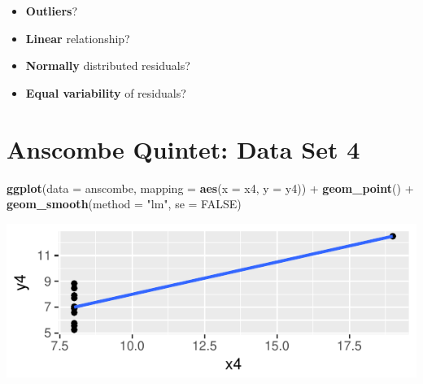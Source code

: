 \documentclass[]{article}
\newenvironment{Shaded}{\begin{snugshade}}{\end{snugshade}}
\newcommand{\KeywordTok}[1]{\textcolor[rgb]{0.13,0.29,0.53}{\textbf{{#1}}}}
\newcommand{\DataTypeTok}[1]{\textcolor[rgb]{0.13,0.29,0.53}{{#1}}}
\newcommand{\StringTok}[1]{\textcolor[rgb]{0.31,0.60,0.02}{{#1}}}
\newcommand{\OtherTok}[1]{\textcolor[rgb]{0.56,0.35,0.01}{{#1}}}
\newcommand{\NormalTok}[1]{{#1}}
\providecommand{\tightlist}{%
  \setlength{\itemsep}{0pt}\setlength{\parskip}{0pt}}
\begin{document}
\begin{itemize}
\tightlist
\item
  \textbf{Outliers}?
\end{itemize}

\vspace{1cm}

\begin{itemize}
\tightlist
\item
  \textbf{Linear} relationship?
\end{itemize}

\vspace{1cm}

\begin{itemize}
\tightlist
\item
  \textbf{Normally} distributed residuals?
\end{itemize}

\vspace{1cm}

\begin{itemize}
\tightlist
\item
  \textbf{Equal variability} of residuals?
\end{itemize}

\newpage

\section{Anscombe Quintet: Data Set
4}\label{anscombe-quintet-data-set-4}

\begin{Shaded}
\begin{Highlighting}[]
\KeywordTok{ggplot}\NormalTok{(}\DataTypeTok{data =} \NormalTok{anscombe, }\DataTypeTok{mapping =} \KeywordTok{aes}\NormalTok{(}\DataTypeTok{x =} \NormalTok{x4, }\DataTypeTok{y =} \NormalTok{y4)) +}
\StringTok{  }\KeywordTok{geom_point}\NormalTok{() +}
\StringTok{  }\KeywordTok{geom_smooth}\NormalTok{(}\DataTypeTok{method =} \StringTok{"lm"}\NormalTok{, }\DataTypeTok{se =} \OtherTok{FALSE}\NormalTok{)}
\end{Highlighting}
\end{Shaded}

\includegraphics{20180417_anscombe_residuals_files/figure-latex/unnamed-chunk-12-1.pdf}
\end{document}
